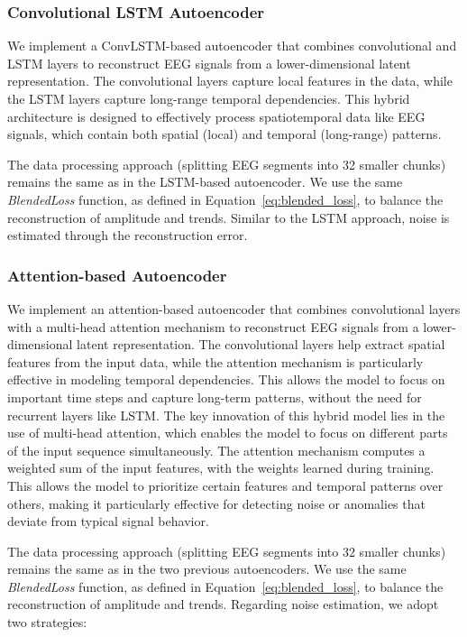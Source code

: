 \subsubsection{Convolutional LSTM Autoencoder}

We implement a ConvLSTM-based autoencoder that combines convolutional and LSTM layers to reconstruct EEG signals from a lower-dimensional latent representation. The convolutional layers capture local features in the data, while the LSTM layers capture long-range temporal dependencies. This hybrid architecture is designed to effectively process spatiotemporal data like EEG signals, which contain both spatial (local) and temporal (long-range) patterns.

The data processing approach (splitting EEG segments into 32 smaller chunks) remains the same as in the LSTM-based autoencoder. We use the same \emph{BlendedLoss} function, as defined in Equation~\ref{eq:blended_loss}, to balance the reconstruction of amplitude and trends. Similar to the LSTM approach, noise is estimated through the reconstruction error.

\subsubsection{Attention-based Autoencoder}

We implement an attention-based autoencoder that combines convolutional layers with a multi-head attention mechanism to reconstruct EEG signals from a lower-dimensional latent representation. The convolutional layers help extract spatial features from the input data, while the attention mechanism is particularly effective in modeling temporal dependencies. This allows the model to focus on important time steps and capture long-term patterns, without the need for recurrent layers like LSTM. The key innovation of this hybrid model lies in the use of multi-head attention, which enables the model to focus on different parts of the input sequence simultaneously. The attention mechanism computes a weighted sum of the input features, with the weights learned during training. This allows the model to prioritize certain features and temporal patterns over others, making it particularly effective for detecting noise or anomalies that deviate from typical signal behavior.

The data processing approach (splitting EEG segments into 32 smaller chunks) remains the same as in the two previous autoencoders. We use the same \emph{BlendedLoss} function, as defined in Equation~\ref{eq:blended_loss}, to balance the reconstruction of amplitude and trends. Regarding noise estimation, we adopt two strategies:

